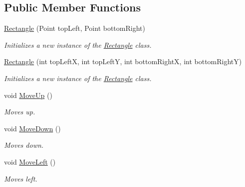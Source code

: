 \subsection*{Public Member Functions}
\begin{DoxyCompactItemize}
\item 
\mbox{\hyperlink{class_test_project_1_1_task_library_1_1_tasks_1_1_lesson6_1_1_models_1_1_rectangle_aff0dea3f3960057f0ce884940931634d}{Rectangle}} (Point top\+Left, Point bottom\+Right)
\begin{DoxyCompactList}\small\item\em Initializes a new instance of the \mbox{\hyperlink{class_test_project_1_1_task_library_1_1_tasks_1_1_lesson6_1_1_models_1_1_rectangle}{Rectangle}} class. \end{DoxyCompactList}\item 
\mbox{\hyperlink{class_test_project_1_1_task_library_1_1_tasks_1_1_lesson6_1_1_models_1_1_rectangle_a8377cd4a5331c4078650a98589cd5fa7}{Rectangle}} (int top\+LeftX, int top\+LeftY, int bottom\+RightX, int bottom\+RightY)
\begin{DoxyCompactList}\small\item\em Initializes a new instance of the \mbox{\hyperlink{class_test_project_1_1_task_library_1_1_tasks_1_1_lesson6_1_1_models_1_1_rectangle}{Rectangle}} class. \end{DoxyCompactList}\item 
void \mbox{\hyperlink{class_test_project_1_1_task_library_1_1_tasks_1_1_lesson6_1_1_models_1_1_rectangle_a67786139a7e5f852c0442423c6a52418}{Move\+Up}} ()
\begin{DoxyCompactList}\small\item\em Moves up. \end{DoxyCompactList}\item 
void \mbox{\hyperlink{class_test_project_1_1_task_library_1_1_tasks_1_1_lesson6_1_1_models_1_1_rectangle_a46416a1374137c9536a3cf0eae8fd2f8}{Move\+Down}} ()
\begin{DoxyCompactList}\small\item\em Moves down. \end{DoxyCompactList}\item 
void \mbox{\hyperlink{class_test_project_1_1_task_library_1_1_tasks_1_1_lesson6_1_1_models_1_1_rectangle_adf5fbf63db1eaf0959ef5e6c9dbdedb2}{Move\+Left}} ()
\begin{DoxyCompactList}\small\item\em Moves left. \end{DoxyCompactList}\item 

\end{DoxyCompactItemize}
